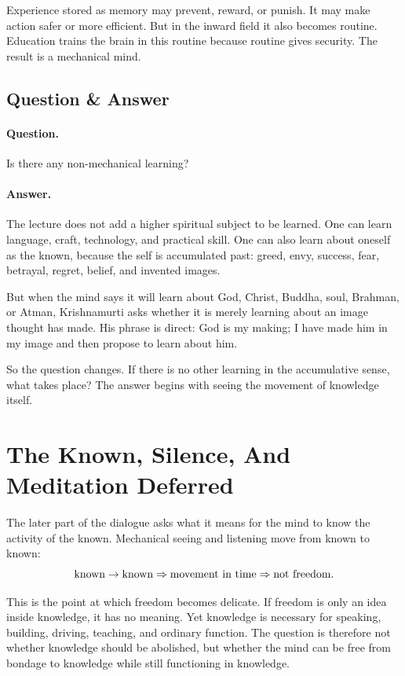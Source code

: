 \documentclass[11pt,oneside]{book}
\begin{document}
Experience stored as memory may prevent, reward, or punish. It may make action safer or more efficient. But in the inward field it also becomes routine. Education trains the brain in this routine because routine gives security. The result is a mechanical mind.

\subsection{Question \& Answer}

\paragraph{Question.}
Is there any non-mechanical learning?

\paragraph{Answer.}
The lecture does not add a higher spiritual subject to be learned. One can learn language, craft, technology, and practical skill. One can also learn about oneself as the known, because the self is accumulated past: greed, envy, success, fear, betrayal, regret, belief, and invented images.

But when the mind says it will learn about God, Christ, Buddha, soul, Brahman, or Atman, Krishnamurti asks whether it is merely learning about an image thought has made. His phrase is direct: God is my making; I have made him in my image and then propose to learn about him.

So the question changes. If there is no other learning in the accumulative sense, what takes place? The answer begins with seeing the movement of knowledge itself.

\section{The Known, Silence, And Meditation Deferred}

The later part of the dialogue asks what it means for the mind to know the activity of the known. Mechanical seeing and listening move from known to known:
\begin{equation}
\hbox{known}\to\hbox{known}
\Rightarrow
\hbox{movement in time}
\Rightarrow
\hbox{not freedom}.
\end{equation}

This is the point at which freedom becomes delicate. If freedom is only an idea inside knowledge, it has no meaning. Yet knowledge is necessary for speaking, building, driving, teaching, and ordinary function. The question is therefore not whether knowledge should be abolished, but whether the mind can be free from bondage to knowledge while still functioning in knowledge.
\end{document}

